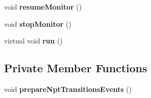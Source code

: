 \begin{CompactItemize}
\item 
void \textbf{resumeMonitor} ()\label{classbr_1_1pucrio_1_1telemidia_1_1ginga_1_1ncl_1_1adapters_1_1NominalEventMonitor_cb0523bc848b2b32ee192104e0ee4349}

\item 
void \textbf{stopMonitor} ()\label{classbr_1_1pucrio_1_1telemidia_1_1ginga_1_1ncl_1_1adapters_1_1NominalEventMonitor_cffea442aa4b3d09cf662cd77d14a1cf}

\item 
virtual void \textbf{run} ()\label{classbr_1_1pucrio_1_1telemidia_1_1ginga_1_1ncl_1_1adapters_1_1NominalEventMonitor_72fcb26a14f6beb1c3fbace9ab3e7dbb}

\end{CompactItemize}
\subsection*{Private Member Functions}
\begin{CompactItemize}
\item 
void \textbf{prepareNptTransitionsEvents} ()\label{classbr_1_1pucrio_1_1telemidia_1_1ginga_1_1ncl_1_1adapters_1_1NominalEventMonitor_604ee1afa6a21df07cc16600eb321f0c}

\end{CompactItemize}
